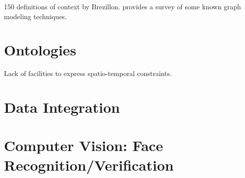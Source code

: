 150 definitions of context by Brezillon.
 \cite{mostefaoui2004context} provides a survey of some known graph modeling techniques.

\section{Ontologies}
Lack of facilities to express spatio-temporal constraints.

\section{Data Integration}

\section{Computer Vision: Face Recognition/Verification}